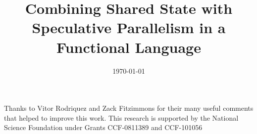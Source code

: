 \documentclass[nocopyrightspace]{../common/sigplanconf}
\title{Combining Shared State with Speculative Parallelism in a Functional Language}
\date{\today}
\theoremstyle{break}
\begin{document}
\maketitle
\thispagestyle{empty}

\sloppy














\acks
Thanks to Vitor Rodriquez and Zack Fitzimmons for their many useful comments that helped to improve this work.  This research is supported by the National Science Foundation under Grants CCF-0811389 and CCF-101056


\end{document}
